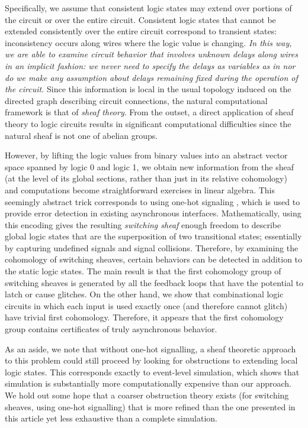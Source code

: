 \documentclass{amsart}
\theoremstyle{plain}
\theoremstyle{definition}
\begin{document}
Specifically, we assume that consistent logic states may extend over portions of the circuit or over the entire circuit.  Consistent logic states that cannot be extended consistently over the entire circuit correspond to transient states: inconsistency occurs along wires where the logic value is changing.  {\it In this way, we are able to examine circuit behavior that involves unknown delays along wires in an implicit fashion: we never need to specify the delays as variables as in \cite{Ishiura_1989} nor do we make any assumption about delays remaining fixed during the operation of the circuit.}  Since this information is local in the usual topology induced on the directed graph describing circuit connections, the natural computational framework is that of {\it sheaf theory}.  From the outset, a direct application of sheaf theory to logic circuits results in significant computational difficulties since the natural sheaf is not one of abelian groups.

However, by lifting the logic values from binary values into an abstract vector space spanned by logic 0 and logic 1, we obtain new information from the sheaf (at the level of its global sections, rather than just in its relative cohomology) and computations become straightforward exercises in linear algebra.  This seemingly abstract trick corresponds to using one-hot signaling \cite{Davis_1997}, which is used to provide error detection in existing asynchronous interfaces.  Mathematically, using this encoding gives the resulting {\it switching sheaf} enough freedom to describe global logic states that are the superposition of two transitional states; essentially by capturing undefined signals and signal collisions.  Therefore, by examining the cohomology of switching sheaves, certain behaviors can be detected in addition to the static logic states.  The main result is that the first cohomology group of switching sheaves is generated by all the feedback loops that have the potential to latch or cause glitches.  On the other hand, we show that combinational logic circuits in which each input is used exactly once (and therefore cannot glitch) have trivial first cohomology.  Therefore, it appears that the first cohomology group contains certificates of truly asynchronous behavior.

As an aside, we note that without one-hot signalling, a sheaf theoretic approach to this problem could still proceed by looking for obstructions to extending local logic states.  This corresponds exactly to event-level simulation, which shows that simulation is substantially more computationally expensive than our approach.  We hold out some hope that a coarser obstruction theory exists (for switching sheaves, using one-hot signalling) that is more refined than the one presented in this article yet less exhaustive than a complete simulation.
\end{document}
